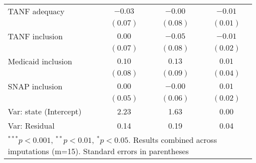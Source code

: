 \begin{table}
\begin{center}
\begin{tabular}{l c c c }
TANF adequacy              & $-0.03$       & $-0.00$      & $-0.01$      \\
                           & $(0.07)$      & $(0.08)$     & $(0.01)$     \\
TANF inclusion             & $0.00$        & $-0.05$      & $-0.01$      \\
                           & $(0.07)$      & $(0.08)$     & $(0.02)$     \\
Medicaid inclusion         & $0.10$        & $0.13$       & $0.01$       \\
                           & $(0.08)$      & $(0.09)$     & $(0.04)$     \\
SNAP inclusion             & $0.00$        & $-0.00$      & $0.01$       \\
                           & $(0.05)$      & $(0.06)$     & $(0.02)$     \\
\hline
Var: state (Intercept)     & 2.23          & 1.63         & 0.00         \\
Var: Residual              & 0.14          & 0.19         & 0.04         \\
\hline
\multicolumn{4}{l}{\scriptsize{$^{***}p<0.001$, $^{**}p<0.01$, $^*p<0.05$. Results combined across imputations (m=15). Standard errors in parentheses}}
\end{tabular}
\label{atab}
\end{center}
\end{table}
